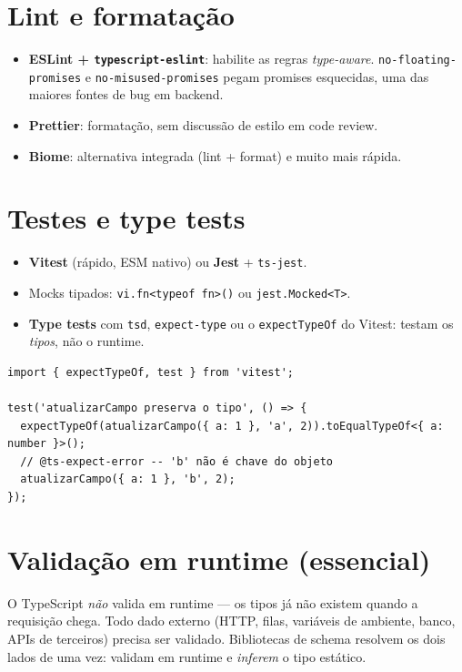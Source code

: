 \documentclass[12pt,a4paper,oneside]{book}
\newcommand{\code}[1]{\texttt{#1}}
\begin{document}
\section{Lint e formatação}

\begin{itemize}
  \item \textbf{ESLint + \code{typescript-eslint}}: habilite as regras \emph{type-aware}. \code{no-floating-promises} e \code{no-misused-promises} pegam promises esquecidas, uma das maiores fontes de bug em backend.
  \item \textbf{Prettier}: formatação, sem discussão de estilo em code review.
  \item \textbf{Biome}: alternativa integrada (lint + format) e muito mais rápida.
\end{itemize}

\section{Testes e type tests}

\begin{itemize}
  \item \textbf{Vitest} (rápido, ESM nativo) ou \textbf{Jest} + \code{ts-jest}.
  \item Mocks tipados: \code{vi.fn<typeof fn>()} ou \code{jest.Mocked<T>}.
  \item \textbf{Type tests} com \code{tsd}, \code{expect-type} ou o \code{expectTypeOf} do Vitest: testam os \emph{tipos}, não o runtime.
\end{itemize}

\begin{verbatim}
import { expectTypeOf, test } from 'vitest';

test('atualizarCampo preserva o tipo', () => {
  expectTypeOf(atualizarCampo({ a: 1 }, 'a', 2)).toEqualTypeOf<{ a: number }>();
  // @ts-expect-error -- 'b' não é chave do objeto
  atualizarCampo({ a: 1 }, 'b', 2);
});
\end{verbatim}

\section{Validação em runtime (essencial)}
\label{sec:validacao}

O TypeScript \emph{não} valida em runtime --- os tipos já não existem quando a requisição chega. Todo dado externo (HTTP, filas, variáveis de ambiente, banco, APIs de terceiros) precisa ser validado. Bibliotecas de schema resolvem os dois lados de uma vez: validam em runtime e \emph{inferem} o tipo estático.
\end{document}
